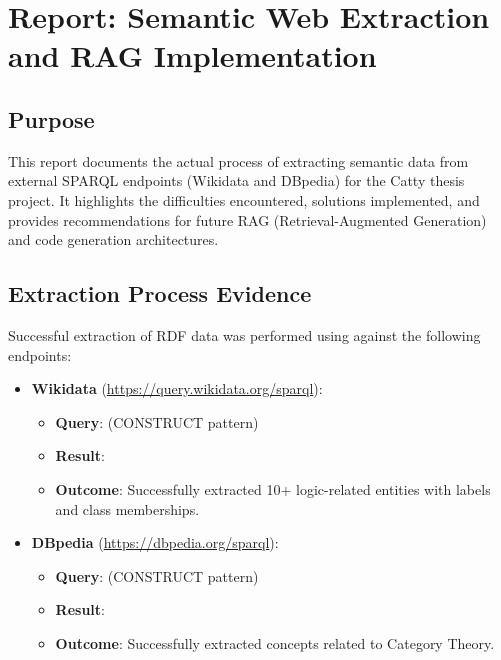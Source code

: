 
\chapter{Report: Semantic Web Extraction and RAG Implementation}
\label{chap:semantic-web-rag}

\section{Purpose}
This report documents the actual process of extracting semantic data from external SPARQL endpoints (Wikidata and DBpedia) for the Catty thesis project. It highlights the difficulties encountered, solutions implemented, and provides recommendations for future RAG (Retrieval-Augmented Generation) and code generation architectures.

\section{Extraction Process Evidence}
Successful extraction of RDF data was performed using  against the following endpoints:

\begin{itemize}
    \item \textbf{Wikidata} (\url{https://query.wikidata.org/sparql}):
    \begin{itemize}
        \item \textbf{Query}:  (CONSTRUCT pattern)
        \item \textbf{Result}: 
        \item \textbf{Outcome}: Successfully extracted 10+ logic-related entities with labels and class memberships.
    \end{itemize}
    \item \textbf{DBpedia} (\url{https://dbpedia.org/sparql}):
    \begin{itemize}
        \item \textbf{Query}:  (CONSTRUCT pattern)
        \item \textbf{Result}: 
        \item \textbf{Outcome}: Successfully extracted concepts related to Category Theory.
    \end{itemize}
\end{itemize}

